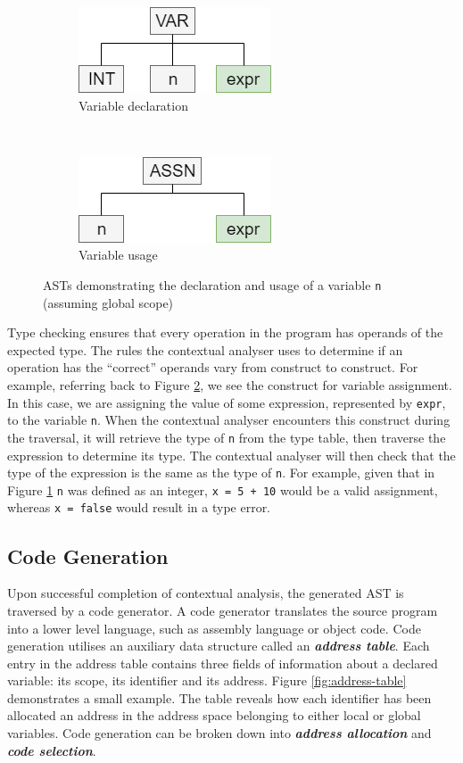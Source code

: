 \documentclass{l4proj}
\begin{document}
\begin{figure}[h]
	\centering
	\begin{subfigure}[b]{0.3\textwidth}
		\includegraphics[scale=0.65]{images/variable-decl.png}
		\caption{Variable declaration}
		\label{fig:variable-decl}
	\end{subfigure}
	~
	\begin{subfigure}[b]{0.3\textwidth}
		\includegraphics[scale=0.65]{images/variable-use.png}
		\caption{Variable usage}
		\label{fig:variable-use}
	\end{subfigure}
	\caption{ASTs demonstrating the declaration and usage of a variable \texttt{n} (assuming global scope)}\label{fig:variable-decl-use}	
\end{figure}

Type checking ensures that every operation in the program has operands of the expected type. The rules the contextual analyser uses to determine if an operation has the ``correct'' operands vary from construct to construct. For example, referring back to Figure \ref{fig:variable-use}, we see the construct for variable assignment. In this case, we are assigning the value of some expression, represented by \texttt{expr}, to the variable \texttt{n}. When the contextual analyser encounters this construct during the traversal, it will retrieve the type of \texttt{n} from the type table, then traverse the expression to determine its type. The contextual analyser will then check that the type of the expression is the same as the type of \texttt{n}. For example, given that in Figure \ref{fig:variable-decl} \texttt{n} was defined as an integer, \texttt{x = 5 + 10} would be a valid assignment, whereas \texttt{x = false} would result in a type error.

\subsection{Code Generation}
Upon successful completion of contextual analysis, the generated AST is traversed by a code generator. A code generator translates the source program into a lower level language, such as assembly language or object code. Code generation utilises an auxiliary data structure called an \textit{\textbf{address table}}. Each entry in the address table contains three fields of information about a declared variable: its scope, its identifier and its address. Figure \ref{fig:address-table} demonstrates a small example. The table reveals how each identifier has been allocated an address in the address space belonging to either local or global variables. Code generation can be broken down into \textit{\textbf{address allocation}} and \textit{\textbf{code selection}}.
\end{document}
